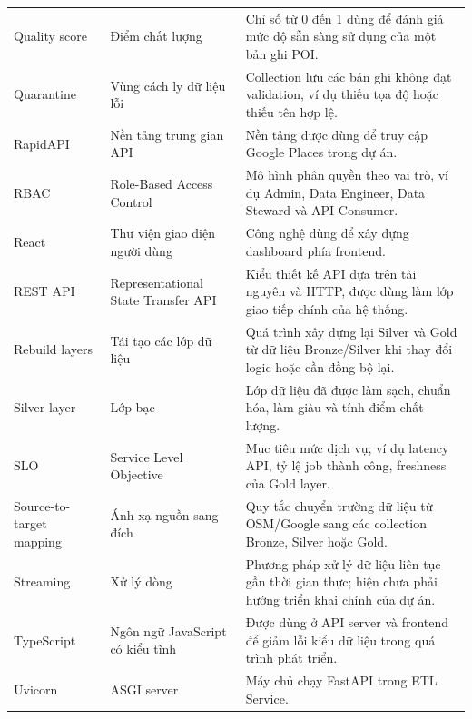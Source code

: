 \documentclass[12pt,a4paper]{article}
\begin{document}
\begin{longtable}{@{}p{}p{}p{}@{}}
Quality score & Điểm chất lượng & Chỉ số từ 0 đến 1 dùng để đánh giá mức độ sẵn sàng sử dụng của một bản ghi POI. \\

Quarantine & Vùng cách ly dữ liệu lỗi & Collection lưu các bản ghi không đạt validation, ví dụ thiếu tọa độ hoặc thiếu tên hợp lệ. \\

RapidAPI & Nền tảng trung gian API & Nền tảng được dùng để truy cập Google Places trong dự án. \\

RBAC & Role-Based Access Control & Mô hình phân quyền theo vai trò, ví dụ Admin, Data Engineer, Data Steward và API Consumer. \\

React & Thư viện giao diện người dùng & Công nghệ dùng để xây dựng dashboard phía frontend. \\

REST API & Representational State Transfer API & Kiểu thiết kế API dựa trên tài nguyên và HTTP, được dùng làm lớp giao tiếp chính của hệ thống. \\

Rebuild layers & Tái tạo các lớp dữ liệu & Quá trình xây dựng lại Silver và Gold từ dữ liệu Bronze/Silver khi thay đổi logic hoặc cần đồng bộ lại. \\

Silver layer & Lớp bạc & Lớp dữ liệu đã được làm sạch, chuẩn hóa, làm giàu và tính điểm chất lượng. \\

SLO & Service Level Objective & Mục tiêu mức dịch vụ, ví dụ latency API, tỷ lệ job thành công, freshness của Gold layer. \\

Source-to-target mapping & Ánh xạ nguồn sang đích & Quy tắc chuyển trường dữ liệu từ OSM/Google sang các collection Bronze, Silver hoặc Gold. \\

Streaming & Xử lý dòng & Phương pháp xử lý dữ liệu liên tục gần thời gian thực; hiện chưa phải hướng triển khai chính của dự án. \\

TypeScript & Ngôn ngữ JavaScript có kiểu tĩnh & Được dùng ở API server và frontend để giảm lỗi kiểu dữ liệu trong quá trình phát triển. \\

Uvicorn & ASGI server & Máy chủ chạy FastAPI trong ETL Service. \\


\end{longtable}
\end{document}
